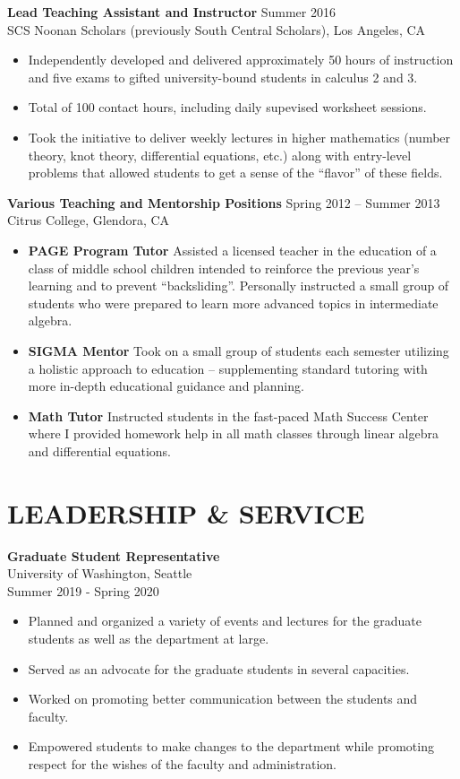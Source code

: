 \documentclass[margin]{res} %
\begin{document}
\begin{resume}
{\bf Lead Teaching Assistant and Instructor} \hfill Summer 2016 \\
SCS Noonan Scholars (previously South Central Scholars), Los Angeles, CA
\begin{itemize} \itemsep -1pt
\item Independently developed and delivered  approximately 50 hours of instruction and five exams to gifted university-bound students in calculus 2 and 3.
\item Total of 100 contact hours, including daily supevised worksheet sessions.
\item Took the initiative to deliver weekly lectures in higher mathematics (number theory, knot theory, differential equations, etc.) along with entry-level problems that allowed students to get a sense of the “flavor” of these fields.
\end{itemize} 

{\bf Various Teaching and Mentorship Positions} \hfill Spring 2012 -- Summer 2013 \\
Citrus College, Glendora, CA
\begin{itemize} \itemsep -1pt
\item {\bf PAGE Program Tutor} Assisted a licensed teacher in the education of a class of middle school children intended to reinforce the previous year’s learning and to prevent “backsliding”. Personally instructed a small group of students who were prepared to learn more advanced topics in intermediate algebra.
\item {\bf SIGMA Mentor} Took on a small group of students each semester utilizing a holistic approach to education – supplementing standard tutoring with more in-depth educational guidance and planning.
\item {\bf Math Tutor} Instructed students in the fast-paced Math Success Center where I provided homework help in all math classes through linear algebra and differential equations.
\end{itemize} 

\section{LEADERSHIP \& SERVICE}

{\bf Graduate Student Representative}\\
University of Washington, Seattle\\
Summer 2019 - Spring 2020
\begin{itemize} \itemsep -1pt
	\item Planned and organized a variety of events and lectures for the graduate students as well as the department at large.
    \item Served as an advocate for the graduate students in several capacities. 
	\item Worked on promoting better communication between the students and faculty.
	\item Empowered students to make changes to the department while promoting respect for the wishes of the faculty and administration.
\end{itemize}


\end{resume}
\end{document}
